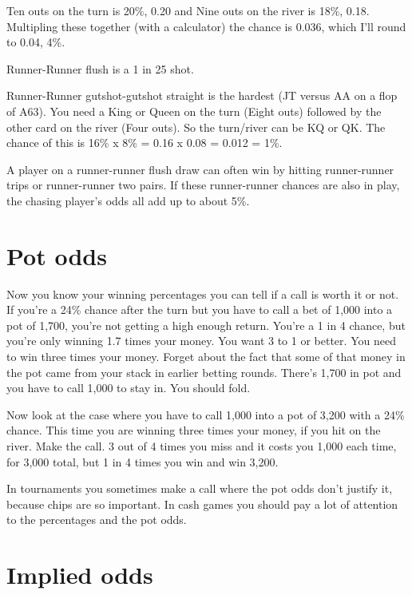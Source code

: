 Ten outs on the turn is 20\%, 0.20 and Nine outs on the river is
18\%, 0.18. Multipling these together (with a calculator) the chance
is 0.036, which I'll round to 0.04, 4\%.

Runner-Runner flush is a 1 in 25 shot.

Runner-Runner gutshot-gutshot straight is the hardest (JT versus AA on
a flop of A63). You need a King or Queen on the turn (Eight outs)
followed by the other card on the river (Four outs). So the turn/river
can be KQ or QK. The chance of this is 16\% x 8\% = 0.16 x 0.08 =
0.012 = 1\%.

A player on a runner-runner flush draw can often win by hitting
runner-runner trips or runner-runner two pairs. If these runner-runner
chances are also in play, the chasing player's odds all add up to
about 5\%.

\section{Pot odds}

Now you know your winning percentages you can tell if a call is worth
it or not. If you're a 24\% chance after the turn but you have to call
a bet of 1,000 into a pot of 1,700, you're not getting a high enough
return. You're a 1 in 4 chance, but you're only winning 1.7 times your
money. You want 3 to 1 or better. You need to win three times your
money. Forget about the fact that some of that money in the pot came
from your stack in earlier betting rounds. There's 1,700 in pot and
you have to call 1,000 to stay in. You should fold.


Now look at the case where you have to call 1,000
into a pot of 3,200 with a 24\% chance. This time you are winning
three times your money, if you hit on the river. Make the call. 3 out
of 4 times you miss and it costs you 1,000 each time, for 3,000 total,
but 1 in 4 times you win and win 3,200.


In tournaments you sometimes make a call where the pot odds don't
justify it, because chips are so important. In cash games you should
pay a lot of attention to the percentages and the pot odds.

\section{Implied odds}

